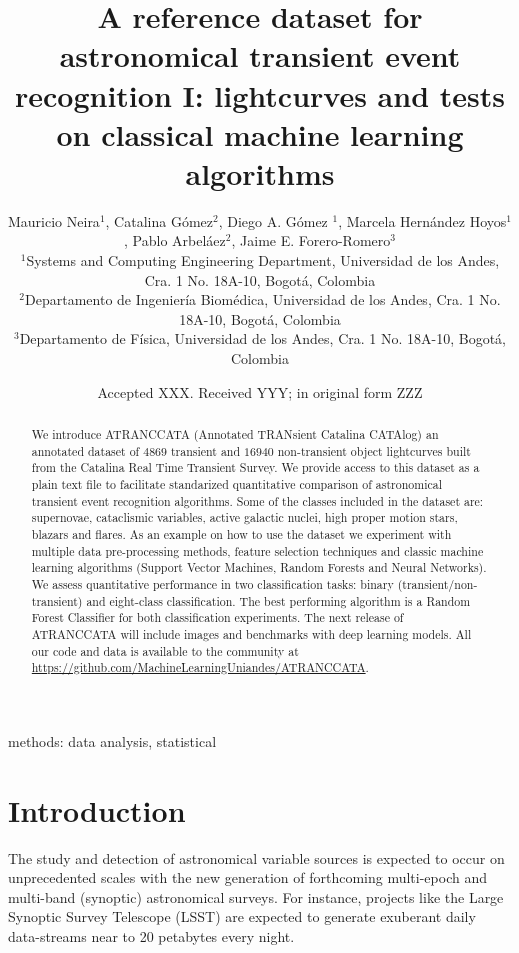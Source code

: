 \documentclass[a4paper,fleqn,usenatbib]{mnras}
\title[A reference transient dataset I: lightcurves]{A reference
  dataset for astronomical transient event recognition I: lightcurves
  and tests on classical machine learning algorithms}
\author[M. Neira et al.]
{Mauricio Neira$^{1}$, Catalina G\'omez$^{2}$, Diego A. G\'omez $^{1}$,
Marcela Hern\'andez Hoyos$^{1}$,   
\newauthor
Pablo Arbel\'aez$^{2}$,
Jaime E. Forero-Romero$^{3}$
\\
$^{1}$Systems and Computing Engineering Department, Universidad de los Andes, Cra. 1 No. 18A-10, Bogot\'a, Colombia\\
$^{2}$Departamento de Ingenier\'ia Biom\'edica, Universidad de los Andes, Cra. 1 No. 18A-10, Bogot\'a, Colombia\\
$^{3}$Departamento de F\'isica, Universidad de los Andes, Cra. 1 No. 18A-10, Bogot\'a, Colombia
}
\date{Accepted XXX. Received YYY; in original form ZZZ}
\begin{document}
\label{firstpage}
\pagerange{\pageref{firstpage}--\pageref{lastpage}}
\maketitle

\begin{abstract}

We introduce ATRANCCATA (Annotated TRANsient Catalina CATAlog) an
annotated dataset of $4869$ transient and $16940$ non-transient
object lightcurves built from the Catalina Real Time Transient
Survey.
We provide access to this dataset as a plain text file to facilitate
standarized quantitative comparison of astronomical transient event
recognition algorithms. 
Some of the classes included in the dataset are: supernovae, cataclismic
variables, active galactic nuclei, high proper motion stars, blazars
and flares.
As an example on how to use the dataset we experiment with multiple
data pre-processing methods, feature selection techniques and classic
machine learning algorithms (Support Vector Machines, Random Forests
and Neural Networks).   
We assess quantitative performance in two classification tasks:
binary (transient/non-transient) and eight-class classification.   
The best performing algorithm is a Random Forest Classifier for both
classification experiments.  
The next release of ATRANCCATA will include images and benchmarks with
deep learning models. 
All our code and data is available to the community at
\url{https://github.com/MachineLearningUniandes/ATRANCCATA}.
\end{abstract}

\begin{keywords}
methods: data analysis, statistical
\end{keywords}



\section{Introduction}

The study and detection of astronomical variable sources is expected
to occur on unprecedented scales with the new generation of
forthcoming multi-epoch and multi-band (synoptic) astronomical
surveys. 
For instance, projects like the Large Synoptic Survey Telescope
(LSST)  \citep{0805.2366,1512.07914} are expected to generate
exuberant daily data-streams near to 20 petabytes every night.   
\end{document}
